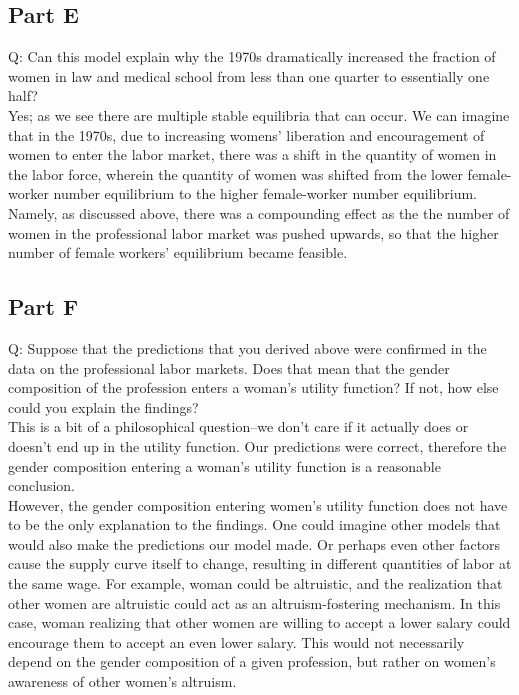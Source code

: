 \documentclass{article}
\begin{document}
\subsection*{Part E}
Q: Can this model explain why the 1970s dramatically increased the fraction of women in law and medical school from less than one quarter to essentially one half?
\\
Yes; as we see there are multiple stable equilibria that can occur. We can imagine that in the 1970s, due to increasing womens' liberation and encouragement of women to enter the labor market, there was a shift in the quantity of women in the labor force, wherein the quantity of women was shifted from the lower female-worker number equilibrium to the higher female-worker number equilibrium. Namely, as discussed above, there was a compounding effect as the the number of women in the professional labor market was pushed upwards, so that the higher number of female workers' equilibrium became feasible. 
\\

\subsection*{Part F}
Q: Suppose that the predictions that you derived above were confirmed in the data on the professional labor markets. Does that mean that the gender composition of the profession enters a woman’s utility function? If not, how else could you explain the findings?
\\

This is a bit of a philosophical question--we don't care if it actually does or doesn't end up in the utility function. Our predictions were correct, therefore the gender composition entering a woman's utility function is a reasonable conclusion.\\

However, the gender composition entering women's utility function does not have to be the only explanation to the findings. One could imagine other models that would also make the predictions our model made. Or perhaps even other factors cause the supply curve itself to change, resulting in different quantities of labor at the same wage. For example, woman could be altruistic, and the realization that other women are altruistic could act as an altruism-fostering mechanism. In this case, woman realizing that other women are willing to accept a lower salary could encourage them to accept an even lower salary. This would not necessarily depend on the gender composition of a given profession, but rather on women's awareness of other women's altruism.
\end{document}

